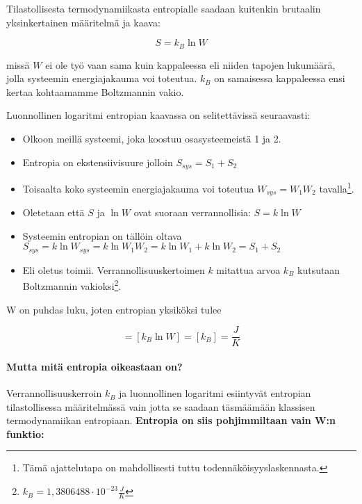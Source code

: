 \documentclass[12pt,a4paper,finnish]{book}
\begin{document}
Tilastollisesta termodynamiikasta entropialle saadaan kuitenkin brutaalin yksinkertainen määritelmä ja kaava:

\begin{equation}
\label{eqn:S}
 S = k_B \ln W
\end{equation}

missä $W$ ei ole työ vaan sama kuin kappaleessa  eli niiden tapojen lukumäärä, jolla 
systeemin energiajakauma voi toteutua. $k_B$ on samaisessa kappaleessa ensi kertaa kohtaamamme Boltzmannin vakio.

Luonnollinen logaritmi entropian kaavassa on selitettävissä seuraavasti:

\begin{itemize}
 \item Olkoon meillä systeemi, joka koostuu osasysteemeistä 1 ja 2.
 \item Entropia on ekstensiivisuure jolloin $S_{sys} = S_1 + S_2$
 \item Toisaalta koko systeemin energiajakauma voi toteutua $W_{sys} = W_1W_2$ tavalla\footnote{Tämä ajattelutapa 
 on mahdollisesti tuttu todennäköisyyslaskennasta.}.
 \item Oletetaan että $S$ ja $\ln W$ ovat suoraan verrannollisia: $S = k \ln W$
 \item Systeemin entropian on tällöin oltava\\ $S_{sys} = k\ln W_{sys} = k\ln W_1W_2 = k \ln W_1 + k \ln W_2 = S_1 + S_2$
 \item Eli oletus toimii. Verrannollisuuskertoimen $k$ mitattua arvoa $k_B$ kutsutaan Boltzmannin 
	vakioksi\footnote{$k_B = 1,3806488\cdot10^{-23}\frac{J}{K}$}.
\end{itemize}

W on puhdas luku, joten entropian yksiköksi tulee

\begin{equation}
 [S] = [k_B\ln W] = [k_B] = \frac{J}{K} %
\end{equation}

\paragraph{Mutta mitä entropia oikeastaan on?}

Verrannollisuuskerroin $k_B$ ja luonnollinen logaritmi esiintyvät entropian tilastollisessa määritelmässä vain 
jotta se saadaan täsmäämään klassisen termodynamiikan entropiaan. \textbf{Entropia on siis pohjimmiltaan vain 
W:n funktio:}
\end{document}
